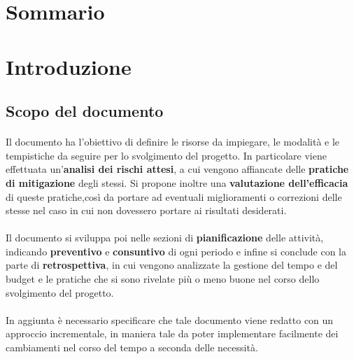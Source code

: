 \documentclass[10pt, a4paper]{article}
\title{\titolo}
\author{SWEetCode}
\begin{document}



\newpage

\tableofcontents
\section*{Sommario}
\listoffigures
\listoftables
\newpage


\section{Introduzione}


\subsection{Scopo del documento}
\paragraph{}Il documento ha l'obiettivo di definire le risorse da impiegare, le modalità e le tempistiche da seguire per lo svolgimento del progetto. In particolare viene effettuata un'\textbf{analisi dei rischi attesi}, a cui vengono affiancate delle \textbf{pratiche di mitigazione} degli stessi. Si propone inoltre una \textbf{valutazione dell'efficacia} di queste pratiche,così da portare ad eventuali miglioramenti o correzioni delle stesse nel caso in cui non dovessero portare ai risultati desiderati.
\paragraph{}Il documento si sviluppa poi nelle sezioni di \textbf{pianificazione} delle attività, indicando \textbf{preventivo} e \textbf{consuntivo} di ogni periodo e infine si conclude con la parte di \textbf{retrospettiva}, in cui vengono analizzate la gestione del tempo e del budget e le pratiche che si sono rivelate più o meno buone nel corso dello svolgimento del progetto.
\paragraph{}In aggiunta è necessario specificare che tale documento viene redatto con un approccio incrementale, in maniera tale da poter implementare facilmente dei cambiamenti nel corso del tempo a seconda delle necessità.
\end{document}
